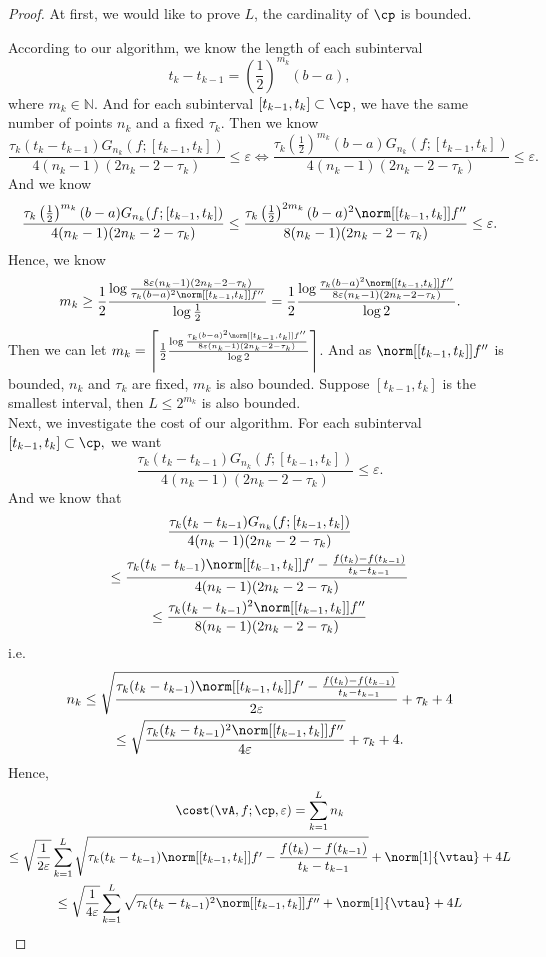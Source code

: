 \documentclass[]{elsarticle}
\theoremstyle{definition}
\theoremstyle{remark}
\begin{document}
\begin{proof}
At first, we would like to prove $L$, the cardinality of $\cp$ is bounded.

According to our algorithm, we know the length of each subinterval $$t_k-t_{k-1}=\left(\frac{1}{2}\right)^{m_k}(b-a),$$ where $m_k \in \mathbb{N}$.
And for each subinterval $[t_{k-1},t_k] \subset \cp$, we have the same number of points $n_k$ and a fixed $\tau_k$. Then we know
$$\frac{\tau_k(t_k-t_{k-1}) G_{n_k}(f;[t_{k-1},t_k]) } {4(n_k-1)(2n_k-2 -\tau_k)} \le \varepsilon \Leftrightarrow 
\frac{\tau_k \left(\frac{1}{2}\right)^{m_k}(b-a) G_{n_k}(f;[t_{k-1},t_k]) } {4(n_k-1)(2n_k-2 -\tau_k)} \le \varepsilon.$$
And we know 
$$\frac{\tau_k\left(\frac{1}{2}\right)^{m_k}(b-a)  G_{n_k}(f;[t_{k-1},t_k]) } {4(n_k-1)(2n_k-2 -\tau_k)} 
\le \frac{\tau_k\left(\frac{1}{2}\right)^{2m_k}(b-a)^2 \norm[{[t_{k-1},t_k]}]{f''} }{8(n_k-1)(2n_k-2 -\tau_k)} \le \varepsilon.$$
Hence, we know
$$m_k \ge \frac{1}{2}\frac{\log{\frac{8\varepsilon(n_k-1)(2n_k-2 -\tau_k)}{\tau_k(b-a)^2 \norm[{[t_{k-1},t_k]}]{f''}}}}{\log{\frac{1}{2}}}
=\frac{1}{2}\frac{\log{\frac{\tau_k(b-a)^2 \norm[{[t_{k-1},t_k]}]{f''}}{8\varepsilon(n_k-1)(2n_k-2 -\tau_k)}}}{\log{2}}.$$
Then we can let $m_k=\left\lceil\frac{1}{2}\frac{\log{\frac{\tau_k(b-a)^2 \norm[{[t_{k-1},t_k]}]{f''}}{8\varepsilon(n_k-1)(2n_k-2 -\tau_k)}}}{\log{2}}
\right\rceil$. And as $\norm[{[t_{k-1},t_k]}]{f''}$ is bounded, $n_k$ and $\tau_k$ are fixed, $m_k$ is also bounded.
Suppose $[t_{k-1},t_k]$ is the smallest interval, then $L \le 2^{m_k} $ is also bounded.\\

Next, we investigate the cost of our algorithm.
For each subinterval $[t_{k-1},t_k] \subset \cp,$ we want
$$\frac{\tau_k(t_k-t_{k-1}) G_{n_k}(f;[t_{k-1},t_k]) } {4(n_k-1)(2n_k-2 -\tau_k)} \le \varepsilon.$$
And we know that
\begin{multline*}
\frac{\tau_k(t_k-t_{k-1}) G_{n_k}(f;[t_{k-1},t_k]) } {4(n_k-1)(2n_k-2 -\tau_k)} \\
\le  \frac{\tau_k(t_k-t_{k-1})\norm[{[t_{k-1},t_k]}]{f'-\frac{f(t_k)-f(t_{k-1})}{t_k-t_{k-1}}} }{4(n_k-1)(2n_k-2 -\tau_k)}\\
\le \frac{\tau_k(t_k-t_{k-1})^2 \norm[{[t_{k-1},t_k]}]{f''} }{8(n_k-1)(2n_k-2 -\tau_k)}
\end{multline*}
i.e.
\begin{multline*}
n_k \le \sqrt{\frac{\tau_k (t_k-t_{k-1})\norm[{[t_{k-1},t_k]}]{f'-\frac{f(t_k)-f(t_{k-1})}{t_k-t_{k-1}}} }{2\varepsilon}} + \tau_k + 4\\
\le \sqrt{\frac{\tau_k (t_k-t_{k-1})^2\norm[{[t_{k-1},t_k]}]{f''} }{4\varepsilon}} + \tau_k + 4.
\end{multline*}
Hence,
\begin{multline*}
\cost(\vA,f;\cp,\varepsilon)=\sum\limits_{k=1}^{L}n_k \\
\le \sqrt{\frac{1}{2\varepsilon}}\sum\limits_{k=1}^{L}\sqrt{\tau_k(t_k-t_{k-1})\norm[{[t_{k-1},t_k]}]{f'-\frac{f(t_k)-f(t_{k-1})}{t_k-t_{k-1}}}}+\norm[1]{\vtau}+4L
\\
\le \sqrt{\frac{1}{4\varepsilon}}\sum\limits_{k=1}^{L}\sqrt{\tau_k(t_k-t_{k-1})^2\norm[{[t_{k-1},t_k]}]{f''}}+\norm[1]{\vtau}+4L
\end{multline*}
\end{proof}
\end{document}
